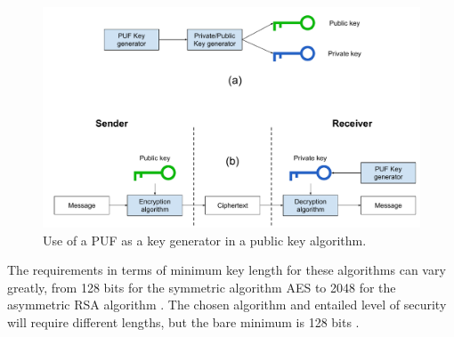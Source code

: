 \begin{figure}[H]
    \centering
    \includegraphics[width=14cm]{images/Asymmetric key generation.pdf}
    \caption{Use of a PUF as a key generator in a public key algorithm.}
    \label{fig:asymm_crypt}
\end{figure}


The requirements in terms of minimum key length for these algorithms can vary greatly, from 128 bits for the symmetric algorithm AES \cite{AES} to 2048 for the asymmetric RSA algorithm \cite{RSA}. The chosen algorithm and entailed level of security will require different lengths, but the bare minimum is 128 bits \cite{Alioto2019}.


